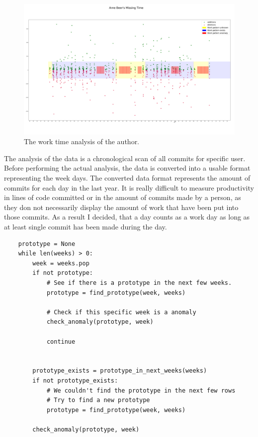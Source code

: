 \begin{figure}[H]
    \includegraphics[scale=0.21]{./graphs/analysis/work-time-analysis}
    \centering
    \caption{The work time analysis of the author.}\label{fig:missing-time}
\end{figure}

The analysis of the data is a chronological scan of all commits for specific user.
Before performing the actual analysis, the data is converted into a usable format representing the week days.
The converted data format represents the amount of commits for each day in the last year.
It is really difficult to measure productivity in lines of code committed or in the amount of commits made by a person, as they don not necessarily display the amount of work that have been put into those commits.
As a result I decided, that a day counts as a work day as long as at least single commit has been made during the day.

\begin{verbatim}
    prototype = None
    while len(weeks) > 0:
        week = weeks.pop
        if not prototype:
            # See if there is a prototype in the next few weeks.
            prototype = find_prototype(week, weeks)

            # Check if this specific week is a anomaly
            check_anomaly(prototype, week)

            continue


        prototype_exists = prototype_in_next_weeks(weeks)
        if not prototype_exists:
            # We couldn't find the prototype in the next few rows
            # Try to find a new prototype
            prototype = find_prototype(week, weeks)

        check_anomaly(prototype, week)
\end{verbatim}


